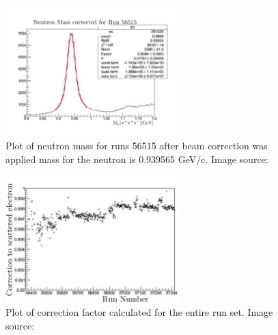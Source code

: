 \begin{figure}\begin{center}
\includegraphics[width=0.6\textwidth]{figures/calib/tag/ecor/FixedmisssingmassneutronII.pdf}
\caption[Neutron Mass for Run 56515 After Beam Correction]{\label{fig:neutron.fix} Plot of neutron mass for runs 56515 after beam correction was applied   mass for the neutron is 0.939565 GeV/c. Image source:~\cite{clas.thesis.kunkel}}
\end{center}\end{figure}

\begin{figure}\begin{center}
\includegraphics[width=0.6\textwidth]{figures/calib/tag/ecor/beam_cor.eps}
\caption[Beam Correction Factors for Entire  Runs]{\label{fig:beamcor.run} Plot of correction factor calculated for the entire  run set. Image source:~\cite{clas.thesis.kunkel}}
\end{center}\end{figure}

